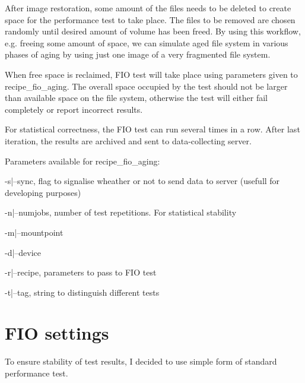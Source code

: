 \documentclass[
  color, %
  table, %
  lof,   %
  lot,   %
]{fithesis3}
\begin{document}
After image restoration, some amount of the files needs to be deleted to create space for the performance test to take place. The files to be removed are chosen randomly until desired amount of volume has been freed. By using this workflow, e.g. freeing some amount of space, we can simulate aged file system in various phases of aging by using just one image of a very fragmented file system.

When free space is reclaimed, FIO test will take place using parameters given to recipe\_fio\_aging. The overall space occupied by the test should not be larger than available space on the file system, otherwise the test will either fail completely or report incorrect results.

For statistical correctness, the FIO test can run several times in a row. After last iteration, the results are archived and sent to data-collecting server.

Parameters available for recipe\_fio\_aging:
\begin{compactenum}
  \item -s|--sync, flag to signalise wheather or not to send data to server (usefull for developing purposes)
  \item -n|--numjobs, number of test repetitions. For statistical stability
  \item -m|--mountpoint
  \item -d|--device
  \item -r|--recipe, parameters to pass to FIO test
  \item -t|--tag, string to distinguish different tests
  \end{compactenum}

\section{FIO settings}
To ensure stability of test results, I decided to use simple form of standard performance test.

\end{document}
